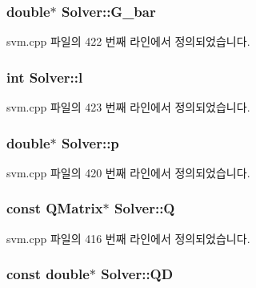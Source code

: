 \hypertarget{class_solver_a89e58cf39a0415c9032b8ec2f4575dcc}{
\subsubsection[{G\+\_\+bar}]{\setlength{\rightskip}{0pt plus 5cm}double$\ast$ Solver\+::\+G\+\_\+bar\hspace{0.3cm}{\ttfamily [protected]}}}\label{class_solver_a89e58cf39a0415c9032b8ec2f4575dcc}


svm.\+cpp 파일의 422 번째 라인에서 정의되었습니다.

\hypertarget{class_solver_a88832d45b6de977b1cbb2afd4c0e494c}{
\subsubsection[{l}]{\setlength{\rightskip}{0pt plus 5cm}int Solver\+::l\hspace{0.3cm}{\ttfamily [protected]}}}\label{class_solver_a88832d45b6de977b1cbb2afd4c0e494c}


svm.\+cpp 파일의 423 번째 라인에서 정의되었습니다.

\hypertarget{class_solver_a882cce072f56679880d409e3e73f7ae8}{
\subsubsection[{p}]{\setlength{\rightskip}{0pt plus 5cm}double$\ast$ Solver\+::p\hspace{0.3cm}{\ttfamily [protected]}}}\label{class_solver_a882cce072f56679880d409e3e73f7ae8}


svm.\+cpp 파일의 420 번째 라인에서 정의되었습니다.

\hypertarget{class_solver_a2d3461718f0570bdc47f5dfb31d61e0a}{
\subsubsection[{Q}]{\setlength{\rightskip}{0pt plus 5cm}const {\bf Q\+Matrix}$\ast$ Solver\+::\+Q\hspace{0.3cm}{\ttfamily [protected]}}}\label{class_solver_a2d3461718f0570bdc47f5dfb31d61e0a}


svm.\+cpp 파일의 416 번째 라인에서 정의되었습니다.

\hypertarget{class_solver_a7c7b7b1207983543855165e8eb249f2a}{
\subsubsection[{Q\+D}]{\setlength{\rightskip}{0pt plus 5cm}const double$\ast$ Solver\+::\+Q\+D\hspace{0.3cm}{\ttfamily [protected]}}}\label{class_solver_a7c7b7b1207983543855165e8eb249f2a}


